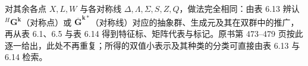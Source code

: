 对其余各点 $X, L, W$ 与各对称线 $\Delta, \Lambda, \Sigma, S, Z, Q$，做法完全相同：由表 6.13 辨认 ${}^{H}\mathbf{G}^{\mathbf{k}}$（对称点）或 $\overline{\mathbf{G}}^{\mathbf{k}*}$（对称线）对应的抽象群、生成元及其在双群中的推广，再从表 6.1、6.5 与表 6.14 得到特征标、矩阵代表与标记。原书第 473--479 页按此逐一给出，此处不再重复；所得的双值小表示及其种类的分类可直接由表 6.13 与 6.14 检索。
